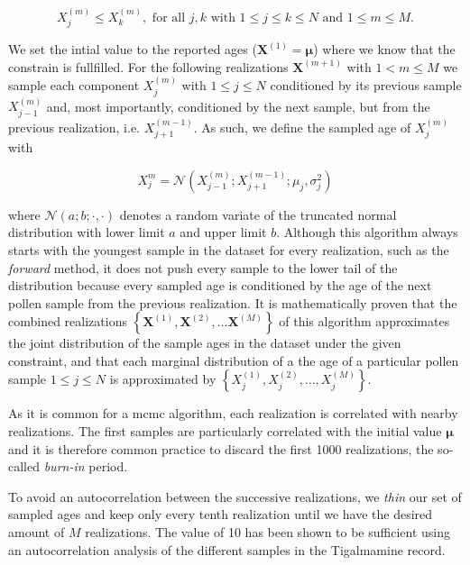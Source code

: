 \documentclass[
11pt, %
english, %
singlespacing, %
headsepline, %
]{MastersDoctoralThesis} %
\begin{document}
\begin{NoHyper}
\begin{refsection}
\begin{equation}
	X^{(m)}_j \leq X^{(m)}_k, \text{ for all } j, k \text{ with } 1 \leq j \leq k \leq N \text{ and } 1\leq m \leq M.
\end{equation}

We set the intial value to the reported ages ($\mathbf{X}^{(1)} = \boldsymbol{\mu}$) where we know that the constrain is fullfilled. For the following realizations $\mathbf{X}^{(m+1)}$ with $1 < m \leq M$ we sample each component $X_j^{(m)}$ with $1 \leq j \leq N$ conditioned by its previous sample $X_{j-1}^{(m)}$ and, most importantly, conditioned by the next sample, but from the previous realization, i.e. $X_{j+1}^{(m-1)}$. As such, we define the sampled age of $X_j^{(m)}$ with

\begin{equation}
	X^{m}_j = \mathcal{N}(X_{j-1}^{(m)}; X_{j+1}^{(m-1)}; \mu_j, \sigma_j^2)
\end{equation}

where $\mathcal{N}(a; b; \cdot, \cdot)$ denotes a random variate of the truncated normal distribution with lower limit $a$ and upper limit $b$. Although this algorithm always starts with the youngest sample in the dataset for every realization, such as the \textit{forward} method, it does not push every sample to the lower tail of the distribution because every sampled age is conditioned by the age of the next pollen sample from the previous realization. It is mathematically proven that the combined realizations $\left\lbrace\mathbf{X}^{(1)}, \mathbf{X}^{(2)}, \ldots \mathbf{X}^{(M)}\right\rbrace$ of this algorithm approximates the joint distribution of the sample ages in the dataset under the given constraint, and that each marginal distribution of a the age of a particular pollen sample $1 \leq j \leq N$ is approximated by $\left\lbrace X_j^{(1)}, X_j^{(2)}, \ldots, X_j^{(M)} \right\rbrace$.

As it is common for a \gls{mcmc} algorithm, each realization is correlated with nearby realizations. The first samples are particularly correlated with the initial value $\boldsymbol{\mu}$ and it is therefore common practice to discard the first 1000 realizations, the so-called \textit{burn-in} period. 

To avoid an autocorrelation between the successive realizations, we \textit{thin} our set of sampled ages and keep only every tenth realization until we have the desired amount of $M$ realizations. The value of 10 has been shown to be sufficient using an autocorrelation analysis of the different samples in the Tigalmamine record.


\end{refsection}
\end{NoHyper}
\end{document}
